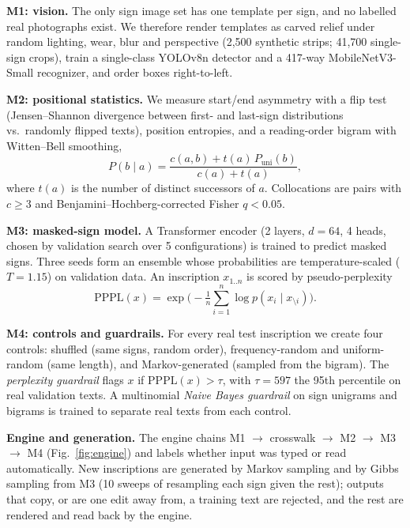 \documentclass[11pt,a4paper,twocolumn]{article}
\begin{document}
\textbf{M1: vision.} The only sign image set has one template per sign, and no labelled real
photographs exist. We therefore render templates as carved relief under random lighting, wear, blur and
perspective (2,500 synthetic strips; 41,700 single-sign crops), train a single-class YOLOv8n detector and
a 417-way MobileNetV3-Small recognizer, and order boxes right-to-left.

\textbf{M2: positional statistics.} We measure start/end asymmetry with a flip test (Jensen--Shannon
divergence between first- and last-sign distributions vs.\ randomly flipped texts), position entropies,
and a reading-order bigram with Witten--Bell smoothing,
\begin{equation}
P(b\mid a)=\frac{c(a,b)+t(a)\,P_{\text{uni}}(b)}{c(a)+t(a)},
\end{equation}
where $t(a)$ is the number of distinct successors of $a$. Collocations are pairs with $c\ge3$ and
Benjamini--Hochberg-corrected Fisher $q<0.05$.

\textbf{M3: masked-sign model.} A Transformer encoder (2 layers, $d{=}64$, 4 heads, chosen by
validation search over 5 configurations) is trained to predict masked signs. Three seeds form an
ensemble whose probabilities are temperature-scaled ($T{=}1.15$) on validation data. An inscription
$x_{1..n}$ is scored by pseudo-perplexity
\begin{equation}
\mathrm{PPPL}(x)=\exp\!\Big(-\tfrac{1}{n}\textstyle\sum_{i=1}^{n}\log p(x_i\mid x_{\setminus i})\Big).
\end{equation}

\textbf{M4: controls and guardrails.} For every real test inscription we create four controls: shuffled
(same signs, random order), frequency-random and uniform-random (same length), and Markov-generated
(sampled from the bigram). The \emph{perplexity guardrail} flags $x$ if $\mathrm{PPPL}(x)>\tau$, with
$\tau=597$ the 95th percentile on real validation texts. A multinomial \emph{Naive Bayes guardrail} on
sign unigrams and bigrams is trained to separate real texts from each control.

\textbf{Engine and generation.} The engine chains M1 $\rightarrow$ crosswalk $\rightarrow$ M2
$\rightarrow$ M3 $\rightarrow$ M4 (Fig.~\ref{fig:engine}) and labels whether input was typed or read
automatically. New inscriptions are generated by Markov sampling and by Gibbs sampling from M3 (10
sweeps of resampling each sign given the rest); outputs that copy, or are one edit away from, a training
text are rejected, and the rest are rendered and read back by the engine.
\end{document}
